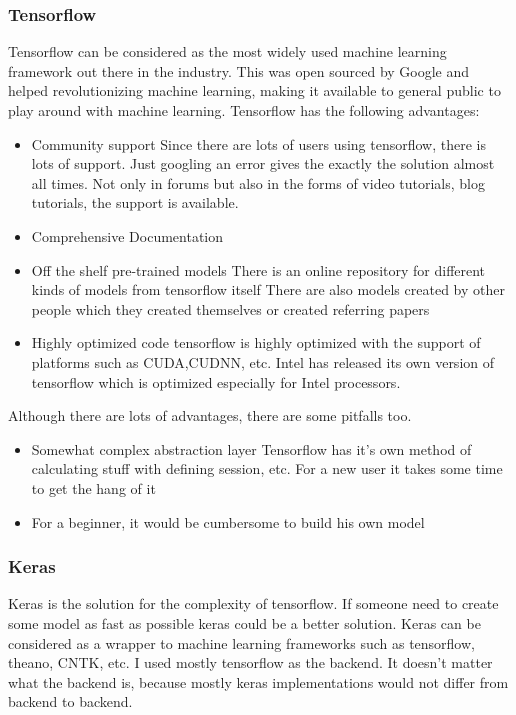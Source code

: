 \subsubsection{Tensorflow}
Tensorflow can be considered as the most widely used machine learning framework out there in the industry. This was open sourced by Google and helped revolutionizing machine learning, making it available to general public to play around with machine learning. Tensorflow has the following advantages:
\begin{itemize}
\item Community support
\subitem Since there are lots of users using tensorflow, there is lots of support. Just googling an error gives the exactly the solution almost all times.
\subitem Not only in forums but also in the forms of video tutorials, blog tutorials, the support is  available.
\item Comprehensive Documentation
\item Off the shelf pre-trained models
\subitem There is an online repository for different kinds of models from tensorflow itself
\subitem There are also models created by other people which they created themselves or created referring papers
\item Highly optimized code
\subitem tensorflow is highly optimized with the support of platforms such as CUDA,CUDNN, etc. 
\subitem Intel has released its own version of tensorflow which is optimized especially for Intel processors.
\end{itemize}

Although there are lots of advantages, there are some pitfalls too.
\begin{itemize}
\item Somewhat complex abstraction layer
\subitem Tensorflow has it's own method of calculating stuff with defining session, etc. For a new user it takes some time to get the hang of it
\item For a beginner, it would be cumbersome to build his own model
\end{itemize}

\subsubsection{Keras}

Keras is the solution for the complexity of tensorflow. If someone need to create some model as fast as possible keras could be a better solution. Keras can be considered as a wrapper to machine learning frameworks such as tensorflow, theano, CNTK, etc. I used mostly tensorflow as the backend. It doesn't matter what the backend is, because mostly keras implementations would not differ from backend to backend.


